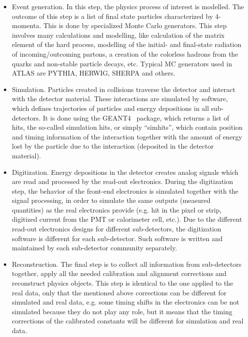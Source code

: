 \begin{itemize}
 \item Event generation. In this step, the physics process of interest is modelled. The outcome of this step is a list of final state particles characterized by 4-momenta. 
This is done by specialized Monte Carlo generators. 
This step involves many calculations and modelling, like calculation of the matrix element of the hard process, modelling of the initial- and final-state radiation of incoming/outcoming partons, a creation of the colorless hadrons from the quarks and non-stable particle decays, etc. 
Typical MC generators used in ATLAS
 are PYTHIA, HERWIG, SHERPA and others.
 \item Simulation. Particles created in collisions traverse the detector and interact with the detector material. These interactions are simulated by software, which defines trajectories of particles and energy depositions in all sub-detectors. 
 It is done using the GEANT4~\cite{Agostinelli:2002hh} package, which returns a list of hits, the so-called simulation hits, or simply ``simhits'', which contain position and timing information of 
 the interaction together with the amount of energy lost by the particle due to the interaction (deposited in the detector material).
 \item Digitization. Energy depositions in the detector creates analog signals which are read and processed by the read-out electronics. During the digitization step, the behavior of the front-end electronics is simulated together with the signal processing, in order to simulate the same outputs (measured quantities) as the real electronics provide (e.g. hit in the pixel or strip,
 digitized current from the PMT or calorimeter cell, etc.). Due to the different read-out electronics designs for different sub-detectors, the digitization software is different for each sub-detector.
 Such software is written and maintained by each sub-detector community separately.
 \item Reconstruction. The final step is to collect all information from sub-detectors together, apply all the needed calibration and alignment corrections and reconstruct physics objects. This step is identical to the one applied to the real data, only that the mentioned above corrections can be different for simulated and real 
 data, e.g. some timing shifts in the electronics can be not simulated because they do not play any role, but it means that the timing corrections of the calibrated constants will be different for simulation and real data.
\end{itemize}

